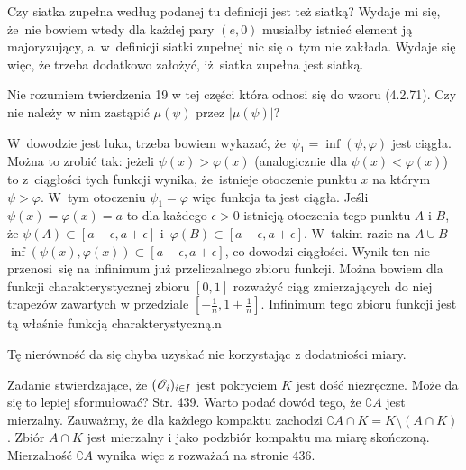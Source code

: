 \documentclass[a4paper,11pt]{article}
\begin{document}
\vspace{\spaceFour}


\start {} Czy siatka zupełna według podanej tu definicji jest
też siatką? Wydaje mi się, że~nie bowiem wtedy dla każdej pary
$(e, 0)$ musiałby istnieć element ją majoryzujący, a~w~definicji
siatki zupełnej nic się o~tym nie zakłada. Wydaje się więc, że trzeba
dodatkowo założyć, iż~siatka zupełna jest siatką.

\vspace{\spaceFour}


\start {} Nie rozumiem twierdzenia 19 w tej części która odnosi
się do wzoru (4.2.71). Czy nie należy w nim zastąpić $\mu( \psi )$
przez $| \mu( \psi ) |$?

\vspace{\spaceFour}


\start {} W~dowodzie jest luka, trzeba bowiem wykazać,
że~$\psi_{ 1 } = \inf( \psi, \varphi )$ jest ciągła. Można to zrobić
tak: jeżeli $\psi( x ) > \varphi( x )$ (analogicznie dla
$\psi( x ) < \varphi( x )$) to z~ciągłości tych funkcji wynika,
że~istnieje otoczenie punktu $x$ na którym $\psi > \varphi$. W~tym
otoczeniu $\psi_{ 1 } = \varphi$ więc funkcja ta jest ciągła. Jeśli
$\psi( x ) = \varphi( x ) = a$ to dla każdego $\epsilon > 0$ istnieją
otoczenia tego punktu $A$ i $B$, że
$\psi( A ) \subset [ a - \epsilon, a + \epsilon ]$
i~$\varphi( B ) \subset [ a - \epsilon, a + \epsilon ]$. W~takim razie
na $A \cup B$
$\inf( \psi( x ), \varphi( x ) ) \subset [ a - \epsilon, a + \epsilon
]$, co dowodzi ciągłości. Wynik ten nie przenosi~się na infinimum już
przeliczalnego zbioru funkcji. Można bowiem dla funkcji
charakterystycznej zbioru $[0, 1]$ rozważyć ciąg zmierzających do niej
trapezów zawartych w przedziale
$[-\frac{ 1 }{ n }, 1 + \frac{ 1 }{ n } ]$. Infinimum tego zbioru
funkcji jest tą właśnie funkcją charakterystyczną.n

\vspace{\spaceFour}


\start {} Tę nierówność da się chyba uzyskać nie korzystając z
dodatniości miary.

\vspace{\spaceFour}


\start {} Zadanie stwierdzające, że
$( \mathcal{O}_{ i } )_{ i \in I }$ jest pokryciem $K$ jest dość
niezręczne. Może da się to lepiej sformułować? \start Str. 439. Warto
podać dowód tego, że $\complement A$ jest mierzalny. Zauważmy, że dla
każdego kompaktu zachodzi
$\complement A \cap K = K \setminus ( A \cap K )$. Zbiór $A \cap K$
jest mierzalny i jako podzbiór kompaktu ma miarę skończoną.
Mierzalność $\complement A$ wynika więc z rozważań na stronie 436.
\end{document}
